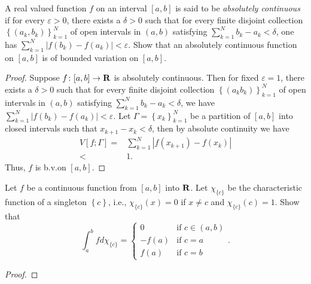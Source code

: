 \begin{problem}
A real valued function $f$ on an interval $[a,b]$ is said to be
\emph{absolutely continuous} if for every $\varepsilon>0$, there exists a
$\delta>0$ such that for every finite disjoint collection
$\left\{(a_k,b_k)\right\}_{k=1}^N$ of open intervals in $(a,b)$ satisfying
$\sum_{k=1}^Nb_k-a_k<\delta$, one has
$\sum_{k=1}^N\left|f(b_k)-f(a_k)\right|<\varepsilon$. Show that an
absolutely continuous function on $[a,b]$ is of bounded variation on
$[a,b]$.
\end{problem}
\begin{proof}
Suppose $f\colon[a,b]\to\mathbf{R}$ is absolutely continuous. Then for fixed
$\varepsilon=1$, there exists a $\delta>0$ such that for every finite
disjoint collection $\left\{ (a_kb_k) \right\}_{k=1}^N$ of open intervals
in $(a,b)$ satisfying $\sum_{k=1}^Nb_k-a_k<\delta$, we have
$\sum_{k=1}^N\left|f(b_k)-f(a_k)\right|<\varepsilon$. Let
$\Gamma=\left\{x_k\right\}_{k=1}^N$ be a partition of $[a,b]$ into closed
intervals such that $x_{k+1}-x_k<\delta$, then by absolute continuity we have
\begin{equation}
\label{eq:absolute-continuity-variation}
\begin{aligned}
V[f;\Gamma]
={}&\sum_{k=1}^N\left|f(x_{k+1})-f(x_k)\right|\\
<{}&1.
\end{aligned}
\end{equation}
Thus, $f$ is b.v.\@ on $[a,b]$.
\end{proof}

\begin{problem}
Let $f$ be a continuous function from $[a,b]$ into $\mathbf{R}$. Let
$\chi_{\{c\}}$ be the characteristic function of a singleton
$\left\{c\right\}$, i.e., $\chi_{\{c\}}(x)=0$ if $x\neq c$ and
$\chi_{\{c\}}(c)=1$. Show that
\[
\int_a^b f d \chi_{\{c\}}=
\begin{cases}
0&\text{if $c\in(a,b)$}\\
-f(a)&\text{if $c=a$}\\
f(a)&\text{if $c=b$}
\end{cases}.
\]
\end{problem}
\begin{proof}
\end{proof}

